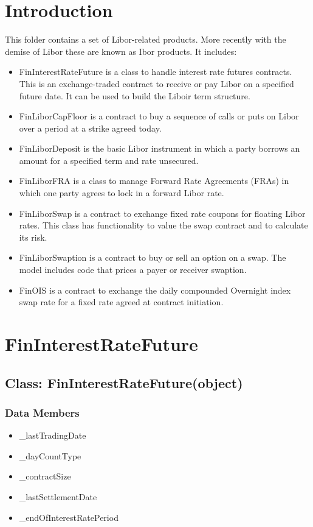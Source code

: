 \documentclass[twoside,11pt]{book}
\begin{document}
\section{Introduction}

This folder contains a set of Libor-related products. More recently with the demise of Libor these are known as Ibor products. It includes:

\begin{itemize}
\item{ FinInterestRateFuture is a class to handle interest rate futures contracts. This is an exchange-traded contract to receive or pay Libor on a specified future date. It can be used to build the Liboir term structure. 
}
\item{ FinLiborCapFloor is a contract to buy a sequence of calls or puts on Libor over a period at a strike agreed today.
}
\item{ FinLiborDeposit is the basic Libor instrument in which a party borrows an amount for a specified term and rate unsecured.
}
\item{ FinLiborFRA is a class to manage Forward Rate Agreements (FRAs) in which one party agrees to lock in a forward Libor rate.
}
\item{ FinLiborSwap is a contract to exchange fixed rate coupons for floating Libor rates. This class has functionality to value the swap contract and to calculate its risk.
}
\item{ FinLiborSwaption is a contract to buy or sell an option on a swap. The model includes code that prices a payer or receiver swaption.
}
\item{ FinOIS is a contract to exchange the daily compounded Overnight index swap rate for a fixed rate agreed at contract initiation.
}
\end{itemize}
\newpage
\section{FinInterestRateFuture}

\subsection*{Class: FinInterestRateFuture(object)}


\subsubsection*{Data Members}
\begin{itemize}
\item{\_lastTradingDate}
\item{\_dayCountType}
\item{\_contractSize}
\item{\_lastSettlementDate}
\item{\_endOfInterestRatePeriod}
\end{itemize}
\end{document}

